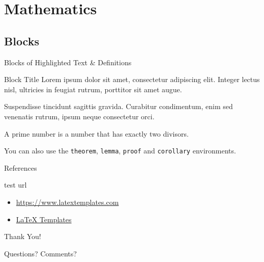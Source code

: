 \documentclass[11pt]{beamer}
\begin{document}
\section{Mathematics}
\subsection{Blocks}
\begin{frame}{Blocks of Highlighted Text \& Definitions}
	\begin{block}{Block Title} %
		Lorem ipsum dolor sit amet, consectetur adipiscing elit. Integer lectus nisl, ultricies in feugiat rutrum, porttitor sit amet augue.
	\end{block}
	\begin{block}{} %
		Suspendisse tincidunt sagittis gravida. Curabitur condimentum, enim sed venenatis rutrum, ipsum neque consectetur orci.
	\end{block}
	\begin{definition}
		A \alert{prime number} is a number that has exactly two divisors.
	\end{definition}
	You can also use the \texttt{theorem}, \texttt{lemma}, \texttt{proof} and \texttt{corollary} environments.
\end{frame}



\begin{frame}[allowframebreaks]{References}
    \footnotesize
    \printbibliography
\end{frame}



\begin{frame}{test url}
    \begin{itemize}
        \item \url{https://www.latextemplates.com}
        \item \href{https://www.latextemplates.com}{LaTeX Templates}
    \end{itemize}
\end{frame}



\begin{frame}[plain] %
	\begin{center}
        {\Huge Thank You!}

		\bigskip\bigskip %

		{\LARGE Questions? Comments?}
	\end{center}
\end{frame}



\end{document}

